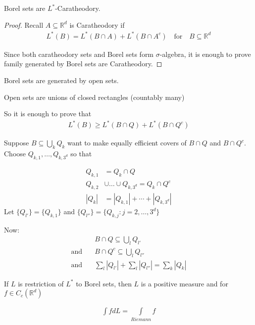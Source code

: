 \begin{lemma}
	Borel sets are $L^*$-Caratheodory.
\end{lemma}

\begin{proof}
	Recall $A \subseteq \mathbb{R}^d$ is Caratheodory if
	\begin{align*}
	L^*(B) = L^*(B \cap A ) + L^*(B \cap A^{c}) \quad \text{for} \quad B \subseteq \mathbb{R}^d
	\end{align*} 

	Since both caratheodory sets and Borel sets form $\sigma$-algebra, it is enough to prove family generated by Borel sets are Caratheodory.


\end{proof}

Borel sets are generated by open sets.

\begin{claim}
	Open sets are unions of closed rectangles (countably many)

	So it is enough to prove that 
	\begin{align*}
	L^*(B) \geq L^*(B \cap Q) + L^* (B\cap Q^{c})
	\end{align*} 
\end{claim}

Suppose $B \subseteq \bigcup_{k} Q_{k}$ want to make equally efficient covers of $B \cap Q$ and $B \cap Q^{c}$. Choose $Q_{k,1}, \ldots , Q_{k,3^d}$ so that

\begin{align*}
	Q_{k,1} &= Q_{k} \cap Q \\
	Q_{k,2} &\cup \ldots \cup Q_{k,3^d} = Q_{k} \cap Q^{c} \\
	|Q_{k}| &= |Q_{k,1}| + \cdots + | Q_{k,3^d} |
\end{align*} 
Let $\{Q_{l'}\} = \{Q_{k,1}\}$ and $\{Q_{l''}\} = \{Q_{k,j} : j = 2, \ldots , 3^d\}$

Now:
 \begin{align*}
&B \cap Q \subseteq \bigcup_{l} Q_{l'} \\
	 \text{and} \quad &B \cap Q^{c} \subseteq \bigcup_{l} Q_{l''} \\
	 \text{and} \quad &\sum_{l} |Q_{l'}| + \sum_{l} | Q_{l''}| = \sum_{k} |Q_k|
\end{align*} 

\begin{theorem}
	If $L$ is restriction of $L^*$ to Borel sets, then $L$ is a positive measure and for $f \in C_{c} (\mathbb{R}^d)$ 

	\begin{align*}
		\int f dL = \underset{Riemann}{\int} f
	\end{align*} 	
\end{theorem}

